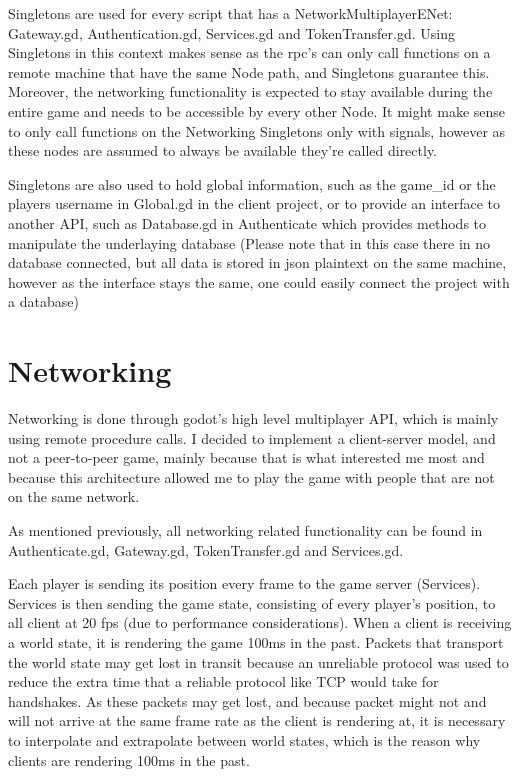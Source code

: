\documentclass{article}
\begin{document}
Singletons are used for every script that has a NetworkMultiplayerENet: Gateway.gd, Authentication.gd, Services.gd and TokenTransfer.gd. Using Singletons in this context makes sense as the rpc's can only call functions on a remote machine that have the same Node path, and Singletons guarantee this. Moreover, the networking functionality is expected to stay available during the entire game and needs to be accessible by every other Node. It might make sense to only call functions on the Networking Singletons only with signals, however as these nodes are assumed to always be available they're called directly.

Singletons are also used to hold global information, such as the game\_id or the players username in Global.gd in the client project, or to provide an interface to another API, such as Database.gd in Authenticate which provides methods to manipulate the underlaying database (Please note that in this case there in no database connected, but all data is stored in json plaintext on the same machine, however as the interface stays the same, one could easily connect the project with a database)

\section{Networking}
Networking is done through godot's high level multiplayer API, which is mainly using remote procedure calls. I decided to implement a client-server model, and not a peer-to-peer game, mainly because that is what interested me most and because this architecture allowed me to play the game with people that are not on the same network.

As mentioned previously, all networking related functionality can be found in Authenticate.gd, Gateway.gd, TokenTransfer.gd and Services.gd.

Each player is sending its position every frame to the game server (Services). Services is then sending the game state, consisting of every player's position, to all client at 20 fps (due to performance considerations). When a client is receiving a world state, it is rendering the game 100ms in the past. Packets that transport the world state may get lost in transit because an unreliable protocol was used to reduce the extra time that a reliable protocol like TCP would take for handshakes. As these packets may get lost, and because packet might not and will not arrive at the same frame rate as the client is rendering at, it is necessary to interpolate and extrapolate between world states, which is the reason why clients are rendering 100ms in the past.
\end{document}
